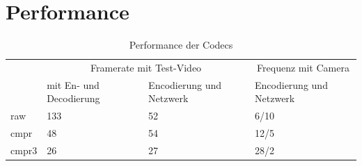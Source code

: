 \section{Performance}

\begin{table}
\centering
\begin{tabular}{|l|l|l|l|}
\hline
      & \multicolumn{2}{|c|}{Framerate mit Test-Video}     & \multicolumn{1}{|c|}{Frequenz mit Camera}      \\
      & mit En- und Decodierung & Encodierung und Netzwerk & Encodierung und Netzwerk \\
\hline
raw   & 133 &  52 & 6/10 \\
cmpr  &  48 &  54 & 12/5 \\
cmpr3 &  26 &  27 & 28/2 \\
\hline
\end{tabular}

\caption{Performance der Codecs}
\end{table}

